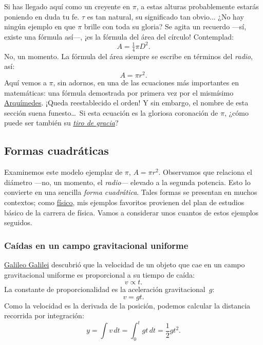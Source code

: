 Si has llegado aquí como un creyente en $\pi$, a estas alturas probablemente estarás poniendo en duda tu fe. $\tau$ es tan natural, su significado tan obvio... ¿No hay ningún ejemplo en que $\pi$ brille con toda su gloria? Se agita un recuerdo ---sí, existe una fórmula así---, ¡es la fórmula del área del círculo! Contemplad:
\[ A = \tfrac{1}{4} \pi D^2. \]
No, un momento. La fórmula del área siempre se escribe en términos del \emph{radio}, así:
\[ A = \pi r^2. \]
Aquí vemos a $\pi$, sin adornos, en una de las ecuaciones más importantes en matemáticas: una fórmula demostrada por primera vez por el mismísimo \href{https://es.wikipedia.org/wiki/Arquímedes}{Arquímedes}. ¡Queda reestablecido el orden! Y sin embargo, el nombre de esta sección suena funesto\ldots\ Si esta ecuación es la gloriosa coronación de $\pi$, ¿cómo puede ser también su \href{https://es.wikipedia.org/wiki/Tiro_de_gracia}{\emph{tiro de gracia}}?


  \subsection{Formas cuadráticas} %
  \label{sec:quadratic_forms}

Examinemos este modelo ejemplar de $\pi$, $A = \pi r^2$. Observamos que relaciona el diámetro ---no, un momento, el \emph{radio}--- elevado a la segunda potencia. Esto lo convierte en una sencilla \emph{forma cuadrática}. Tales formas se presentan en muchos contextos; como \href{http://thesis.library.caltech.edu/1940/}{físico}, mis ejemplos favoritos provienen del plan de estudios básico de la carrera de física. Vamos a considerar unos cuantos de estos ejemplos seguidos.

    \subsubsection{Caídas en un campo gravitacional uniforme} %
    \label{sec:falling_in_a_uniform_gravitational_field}

\href{https://es.wikipedia.org/wiki/Galileo_Galilei}{Galileo Galilei} descubrió que la velocidad de un objeto que cae en un campo gravitacional uniforme es proporcional a su tiempo de caída:
\[ v \propto t. \]
La constante de proporcionalidad es la aceleración gravitacional~$g$:
\[ v = g t. \]
Como la velocidad es la derivada de la posición, podemos calcular la distancia recorrida por integración:
\[ y = \int v\,dt = \int_0^t gt\,dt = \textstyle{\frac{1}{2}} gt^2. \]



